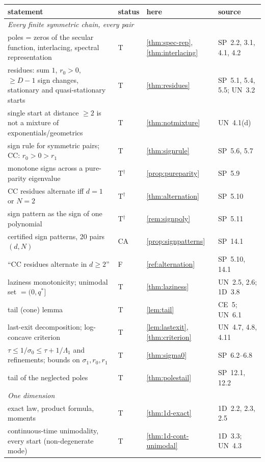 \documentclass[10pt,a4paper]{article}
\theoremstyle{plain}
\theoremstyle{definition}
\newcommand{\NEW}{\ensuremath{^{\dagger}}}       %
\newcommand{\ONE}{\textsf{1D}}
\newcommand{\SPE}{\textsf{SP}}
\newcommand{\UNI}{\textsf{UN}}
\newcommand{\CER}{\textsf{CE}}
\begin{document}
{\small
\begin{longtable}{p{}p{}p{}p{}}
\toprule
statement & status & here & source\\
\midrule
\endhead
\multicolumn{4}{l}{\emph{Every finite symmetric chain, every pair}}\\
poles = zeros of the secular function, interlacing, spectral representation & T & \ref{thm:spec-rep}, \ref{thm:interlacing} & \SPE\ 2.2, 3.1, 4.1, 4.2\\
residues: sum $1$, $r_0>0$, $\ge D-1$ sign changes, stationary and quasi-stationary starts & T & \ref{thm:residues} & \SPE\ 5.1, 5.4, 5.5; \UNI\ 3.2\\
single start at distance $\ge2$ is not a mixture of exponentials/geometrics & T & \ref{thm:notmixture} & \UNI\ 4.1(d)\\
sign rule for symmetric pairs; CC: $r_0>0>r_1$ & T & \ref{thm:signrule} & \SPE\ 5.6, 5.7\\
monotone signs across a pure-parity eigenvalue & T\NEW & \ref{prop:pureparity} & \SPE\ 5.9\\
CC residues alternate iff $d=1$ or $N=2$ & T\NEW & \ref{thm:alternation} & \SPE\ 5.10\\
sign pattern as the sign of one polynomial & T\NEW & \ref{rem:signpoly} & \SPE\ 5.11\\
certified sign patterns, 20 pairs $(d,N)$ & CA & \ref{prop:signpatterns} & \SPE\ 14.1\\
``CC residues alternate in $d\ge2$'' & F & \ref{ref:alternation} & \SPE\ 5.10, 14.1\\
laziness monotonicity; unimodal set $=(0,q^*]$ & T & \ref{thm:laziness} & \UNI\ 2.5, 2.6; \ONE\ 3.8\\
tail (cone) lemma & T & \ref{lem:tail} & \CER\ 5; \UNI\ 6.1\\
last-exit decomposition; log-concave criterion & T & \ref{lem:lastexit}, \ref{thm:criterion} & \UNI\ 4.7, 4.8, 4.11\\
$\tau\le1/\sigma_0\le\tau+1/\Lambda_1$ and refinements; bounds on $\sigma_1,r_0,r_1$ & T & \ref{thm:sigma0} & \SPE\ 6.2--6.8\\
tail of the neglected poles & T & \ref{thm:polestail} & \SPE\ 12.1, 12.2\\
\midrule
\multicolumn{4}{l}{\emph{One dimension}}\\
exact law, product formula, moments & T & \ref{thm:1d-exact} & \ONE\ 2.2, 2.3, 2.5\\
continuous-time unimodality, every start (non-degenerate mode) & T & \ref{thm:1d-cont-unimodal} & \ONE\ 3.3; \UNI\ 4.3\\

\end{longtable}}
\end{document}
